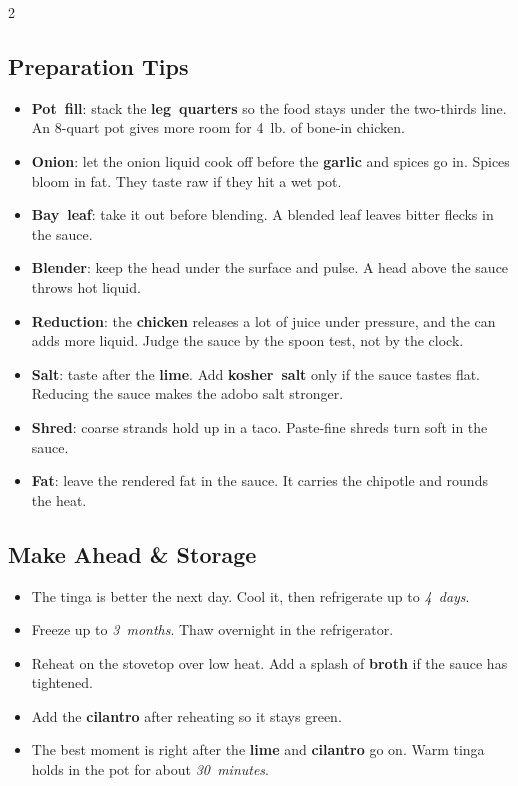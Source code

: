 \documentclass[11pt,letterpaper]{article}
\begin{document}
{\begin{multicols}{2}
\subsection*{Preparation Tips}
\begin{itemize}
    \item \textbf{Pot~fill}: stack the \textbf{leg~quarters} so the food stays under the two-thirds line. An 8-quart pot gives more room for 4~lb. of bone-in chicken.
    \item \textbf{Onion}: let the onion liquid cook off before the \textbf{garlic} and spices go in. Spices bloom in fat. They taste raw if they hit a wet pot.
    \item \textbf{Bay~leaf}: take it out before blending. A blended leaf leaves bitter flecks in the sauce.
    \item \textbf{Blender}: keep the head under the surface and pulse. A head above the sauce throws hot liquid.
    \item \textbf{Reduction}: the \textbf{chicken} releases a lot of juice under pressure, and the can adds more liquid. Judge the sauce by the spoon test, not by the clock.
    \item \textbf{Salt}: taste after the \textbf{lime}. Add \textbf{kosher~salt} only if the sauce tastes flat. Reducing the sauce makes the adobo salt stronger.
    \item \textbf{Shred}: coarse strands hold up in a taco. Paste-fine shreds turn soft in the sauce.
    \item \textbf{Fat}: leave the rendered fat in the sauce. It carries the chipotle and rounds the heat.
\end{itemize}

\subsection*{Make Ahead \& Storage}
\begin{itemize}
    \item The tinga is better the next day. Cool it, then refrigerate up to \textit{4~days}.
    \item Freeze up to \textit{3~months}. Thaw overnight in the refrigerator.
    \item Reheat on the stovetop over low heat. Add a splash of \textbf{broth} if the sauce has tightened.
    \item Add the \textbf{cilantro} after reheating so it stays green.
    \item The best moment is right after the \textbf{lime} and \textbf{cilantro} go on. Warm tinga holds in the pot for about \textit{30~minutes}.
\end{itemize}


\end{multicols}}
\end{document}
